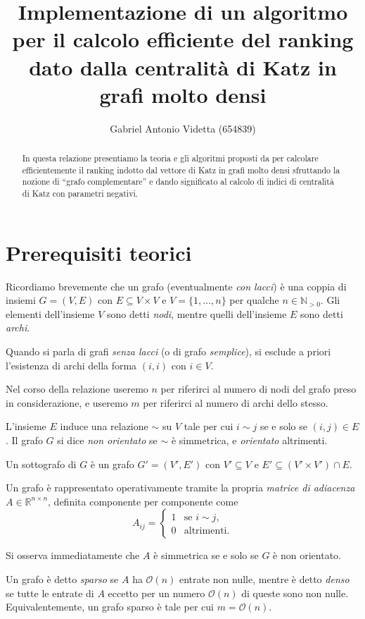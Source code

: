 \documentclass[a4paper]{article}
\title{Implementazione di un algoritmo per il calcolo efficiente del ranking dato dalla centralità di Katz in grafi molto densi}
\author{Gabriel Antonio Videtta (\textsc{654839})}
\newcommand{\NNp}{\mathbb{N}_{> 0}}
\newcommand{\RR}{\mathbb{R}}
\newcommand{\se}{\text{se }}
\newcommand{\altrimenti}{\text{altrimenti}}
\newcommand{\OO}{\mathcal{O}}
\begin{document}
\maketitle

\begin{abstract}
In questa relazione presentiamo la teoria e gli algoritmi
proposti da \cite{katz2024} per calcolare efficientemente il ranking indotto dal
vettore di Katz in grafi molto densi sfruttando la nozione di ``grafo complementare''
e dando significato al calcolo di indici di centralità di Katz con parametri
negativi.
\end{abstract}

\section{Prerequisiti teorici}

Ricordiamo brevemente che un grafo (eventualmente \textit{con lacci}) è una coppia di insiemi $G = (V, E)$ con $E \subseteq V \times V$ e $V = \{1, \ldots, n\}$ per qualche $n \in \NNp$. Gli elementi dell'insieme $V$ sono detti \textit{nodi}, mentre quelli dell'insieme $E$ sono detti \textit{archi}.

Quando si parla di grafi \textit{senza lacci} (o di grafo \textit{semplice}), si esclude a priori l'esistenza di archi
della forma $(i, i)$ con $i \in V$.

Nel corso della relazione useremo $n$ per riferirci al numero di
nodi del grafo preso in considerazione, e useremo $m$ per riferirci al
numero di archi dello stesso.

L'insieme $E$ induce una relazione $\sim$ su $V$ tale per cui $i \sim j$ se e solo se $(i, j) \in E$. Il grafo $G$ si dice \textit{non orientato} se $\sim$ è simmetrica, e \textit{orientato} altrimenti.

Un sottografo di $G$ è un grafo $G' = (V', E')$ con $V' \subseteq V$
e $E' \subseteq (V' \times V') \cap E$.

Un grafo è rappresentato operativamente tramite la propria \textit{matrice
di adiacenza} $A \in \RR^{n \times n}$, definita componente per componente come
\[
    A_{ij} = \begin{cases}
        1 & \se i \sim j, \\
        0 & \altrimenti.
    \end{cases}
\]

Si osserva immediatamente che $A$ è simmetrica se e solo se $G$ è non orientato.

Un grafo è detto \textit{sparso} se $A$ ha $\OO(n)$ entrate non nulle, mentre è detto \textit{denso}
se tutte le entrate di $A$ eccetto per un numero $\OO(n)$ di queste sono non nulle. Equivalentemente, un grafo sparso è tale per cui $m = \OO(n)$.
\end{document}
